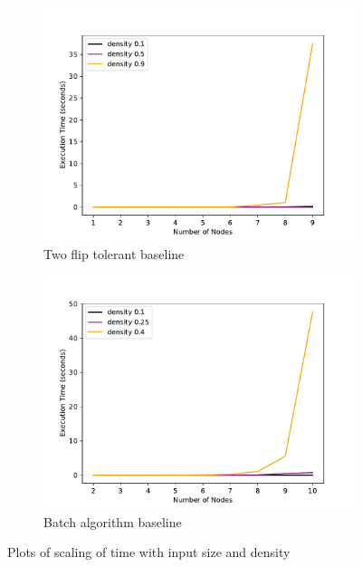 \documentclass[sigplan]{acmart}
\begin{document}
\begin{figure}\ContinuedFloat

    \begin{subfigure}{\linewidth}
      \includegraphics[width=\linewidth]{timeVsSize_10_TwoFlipPathChecker.pdf}
      \caption{Two flip tolerant baseline}
      \label{fig:sfigTwoFlipTvsS}
    \end{subfigure}

    \begin{subfigure}{\linewidth}
      \includegraphics[width=\linewidth]{timeVsSize_10_BatchChecker.pdf}
      \caption{Batch algorithm baseline}
      \label{fig:sfigBatchTvsS}
    \end{subfigure}
    \caption{Plots of scaling of time with input size and density}
    \label{fig:timeVsSize}
\end{figure}
\end{document}
